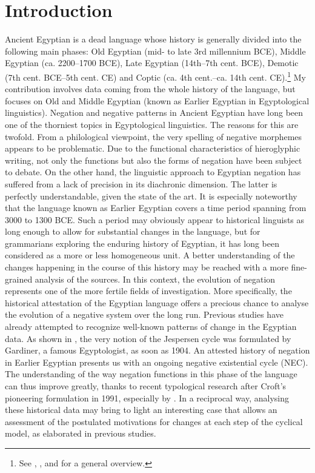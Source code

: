 \documentclass[output=paper]{langsci/langscibook}
\author{Elsa Oréal\affiliation{French National Centre for Scientific Research}}
\begin{document}
\maketitle

\section{Introduction}\label{s:AE1}
Ancient Egyptian is a dead language whose history is generally divided into the following main phases: Old Egyptian (mid- to late 3rd millennium BCE), Middle Egyptian (ca. 2200–1700 BCE), Late Egyptian (14th–7th cent. BCE), Demotic (7th cent. BCE–5th cent. CE) and Coptic (ca. 4th cent.–ca. 14th cent. CE).\footnote{See \citet{Loprieno1995}, \citet{LoprienoMuller2012}, and \citet{GrossmanRichter} for a general overview.} My contribution involves data coming from the whole history of the language, but focuses on Old and Middle Egyptian (known as Earlier Egyptian in Egyptological linguistics). Negation and negative patterns in Ancient Egyptian have long been one of the thorniest topics in Egyptological linguistics. The reasons for this are twofold. From a philological viewpoint, the very spelling of negative morphemes appears to be problematic. Due to the functional characteristics of hieroglyphic writing, not only the functions but also the forms of negation have been subject to debate. On the other hand, the linguistic approach to Egyptian negation has suffered from a lack of precision in its diachronic dimension. The latter is perfectly understandable, given the state of the art. It is especially noteworthy that the language known as Earlier Egyptian covers a time period spanning from 3000 to 1300 BCE. Such a period may obviously appear to historical linguists as long enough to allow for substantial changes in the language, but for grammarians exploring the enduring history of Egyptian, it has long been considered as a more or less homogeneous unit. A better understanding of the changes happening in the course of this history may be reached with a more fine-grained analysis of the sources. In this context, the evolution of negation represents one of the more fertile fields of investigation. More specifically, the historical attestation of the Egyptian language offers a precious chance to analyse the evolution of a negative system over the long run. Previous studies have already attempted to recognize well-known patterns of change in the Egyptian data. As shown in \cite{vanderAuwera2009}, the very notion of the Jespersen cycle was formulated by Gardiner, a famous Egyptologist, as soon as 1904. An attested history of negation in Earlier Egyptian presents us with an ongoing negative existential cycle (NEC). The understanding of the way negation functions in this phase of the language can thus improve greatly, thanks to recent typological research after Croft’s pioneering formulation in 1991, especially by \citet{Veselinova2013, Veselinova2014, Veselinova2016}. In a reciprocal way, analysing these historical data may bring to light an interesting case that allows an assessment of the postulated motivations for changes at each step of the cyclical model, as elaborated in previous studies.
\end{document}
